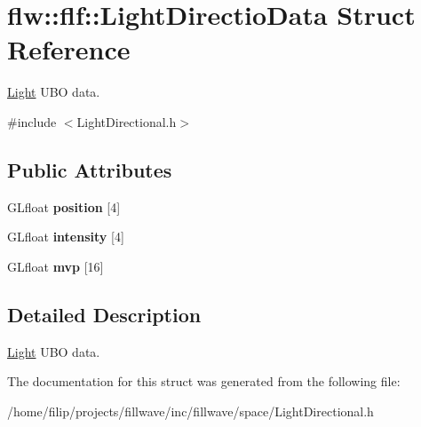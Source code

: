 \hypertarget{structflw_1_1flf_1_1LightDirectioData}{}\section{flw\+:\+:flf\+:\+:Light\+Directio\+Data Struct Reference}
\label{structflw_1_1flf_1_1LightDirectioData}


\hyperlink{classflw_1_1flf_1_1Light}{Light} U\+BO data.  




{\ttfamily \#include $<$Light\+Directional.\+h$>$}

\subsection*{Public Attributes}
\begin{DoxyCompactItemize}
\item 
\mbox{\label{structflw_1_1flf_1_1LightDirectioData_ab93fd8912e661b05321da657edf5e2b8}} 
G\+Lfloat {\bfseries position} \mbox{[}4\mbox{]}
\item 
\mbox{\label{structflw_1_1flf_1_1LightDirectioData_ad3d310df515162775577c730388ae561}} 
G\+Lfloat {\bfseries intensity} \mbox{[}4\mbox{]}
\item 
\mbox{\label{structflw_1_1flf_1_1LightDirectioData_ad0792b0c7715fa130dfa0aecfed8b5db}} 
G\+Lfloat {\bfseries mvp} \mbox{[}16\mbox{]}
\end{DoxyCompactItemize}


\subsection{Detailed Description}
\hyperlink{classflw_1_1flf_1_1Light}{Light} U\+BO data. 

The documentation for this struct was generated from the following file\+:\begin{DoxyCompactItemize}
\item 
/home/filip/projects/fillwave/inc/fillwave/space/Light\+Directional.\+h\end{DoxyCompactItemize}
